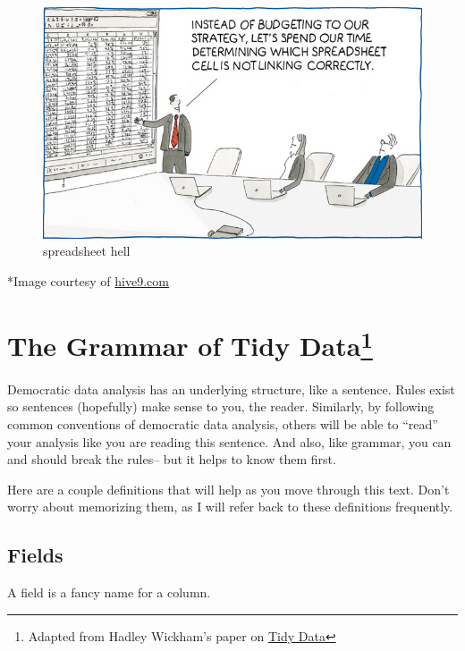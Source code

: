 \documentclass[]{book}
\begin{document}
\begin{figure}
\centering
\includegraphics{images/spreadsheet_hell.png}
\caption{spreadsheet hell}
\end{figure}

*Image courtesy of \href{https://www.hive9.com/blog/just-say-no-to-spreadsheets}{hive9.com}

\hypertarget{the-grammar-of-tidy-data}{%
\section[The Grammar of Tidy Data]{\texorpdfstring{The Grammar of Tidy Data\footnote{Adapted from Hadley Wickham's paper on \href{https://vita.had.co.nz/papers/tidy-data.pdf}{Tidy Data}}}{The Grammar of Tidy Data}}\label{the-grammar-of-tidy-data}}

Democratic data analysis has an underlying structure, like a sentence. Rules exist so sentences (hopefully) make sense to you, the reader. Similarly, by following common conventions of democratic data analysis, others will be able to ``read'' your analysis like you are reading this sentence. And also, like grammar, you can and should break the rules-- but it helps to know them first.

Here are a couple definitions that will help as you move through this text. Don't worry about memorizing them, as I will refer back to these definitions frequently.

\hypertarget{fields}{%
\subsection{Fields}\label{fields}}

A field is a fancy name for a column.
\end{document}
